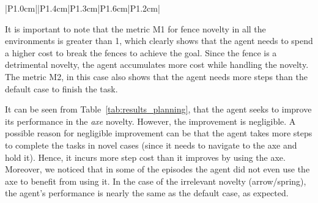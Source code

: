 \documentclass[sigconf]{aamas}
\begin{document}
\begin{table}[!tb]
\begin{center}
\begin{tabular}{|P{1.0cm}||P{1.4cm}|P{1.3cm}|P{1.6cm}|P{1.2cm}|}
 \hline
\end{tabular}
\caption{\label{tab:results_planning}~Table shows the results of the performance of the planning agent on all the four tasks. In each task, it shows pre-novelty (Default) scenario and 3 post-novelty (Fence, Arrow/Spring, Axe) scenarios.}
\end{center}
\end{table}
%

It is important to note that the metric M1 for fence novelty in all the environments is greater than 1, which clearly shows that the agent needs to spend a higher cost to break the fences to achieve the goal. Since the fence is a detrimental novelty, the agent accumulates more cost while handling the novelty. The metric M2, in this case also shows that the agent needs more steps than the default case to finish the task.

It can be seen from Table~\ref{tab:results_planning}, that the agent seeks to improve its performance in the \emph{axe} novelty. However, the improvement is negligible. A possible reason for negligible improvement can be that the agent takes more steps to complete the tasks in novel cases (since it needs to navigate to the axe and hold it). Hence, it incurs more step cost than it improves by using the axe. Moreover, we noticed that in some of the episodes the agent did not even use the axe to benefit from using it. In the case of the irrelevant novelty (arrow/spring), the agent's performance is nearly the same as the default case, as expected. 
\end{document}
